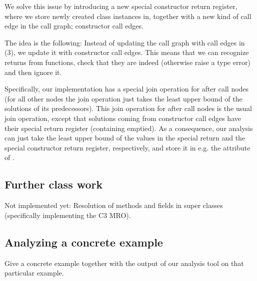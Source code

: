 We solve this issue by introducing a new special constructor return register, where we store newly created class instances in, together with a new kind of call edge in the call graph; constructor call edges.

The idea is the following: Instead of updating the call graph with call edges in (3), we update it with constructor call edges. This means that we can recognize returns from  functions, check that they are indeed  (otherwise raise a type error) and then ignore it.

Specifically, our implementation has a special join operation for after call nodes (for all other nodes the join operation just takes the least upper bound of the solutions of its predecessors). This join operation for after call nodes is the usual join operation, except that solutions coming from constructor call edges have their special return register (containing  emptied). As a consequence, our analysis can just take the least upper bound of the values in the special return and the special constructor return register, respectively, and store it in e.g. the attribute  of .


\subsection{Further class work}
Not implemented yet: Resolution of methods and fields in super classes (specifically implementing the C3 MRO).

\subsection{Analyzing a concrete example}
Give a concrete example together with the output of our analysis tool on that particular example.